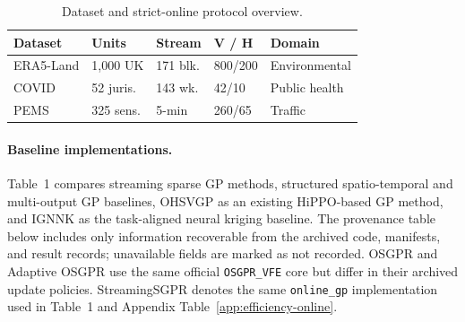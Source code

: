 \begin{table}[H]
\centering
\caption{Dataset and strict-online protocol overview.}
\label{app:dataset-overview}
\scriptsize
\setlength{\tabcolsep}{0.7pt}
\begin{tabular}{@{}lllll@{}}
\toprule
Dataset & Units & Stream & V / H & Domain \\
\midrule
ERA5-Land & 1,000 UK & 171 blk. & 800/200 & Environmental \\
COVID & 52 juris. & 143 wk. & 42/10 & Public health \\
PEMS & 325 sens. & 5-min & 260/65 & Traffic \\
\bottomrule
\end{tabular}
\end{table}
\FloatBarrier

\paragraph{Baseline implementations.}
Table~1 compares streaming sparse GP methods, structured spatio-temporal and multi-output GP baselines, OHSVGP as an existing HiPPO-based GP method, and IGNNK as the task-aligned neural kriging baseline. The provenance table below includes only information recoverable from the archived code, manifests, and result records; unavailable fields are marked as not recorded. OSGPR and Adaptive OSGPR use the same official \texttt{OSGPR\_VFE} core but differ in their archived update policies. StreamingSGPR denotes the same \texttt{online\_gp} implementation used in Table~1 and Appendix Table~\ref{app:efficiency-online}.

